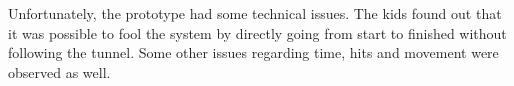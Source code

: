 Unfortunately, the prototype had some technical issues. The kids found out that it was possible to fool the system by directly going from start to finished without following the tunnel. Some other issues regarding time, hits and movement were observed as well. 





